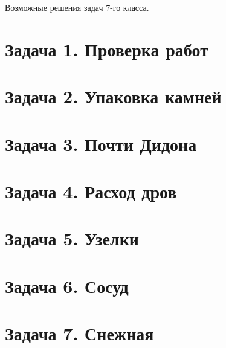 
%


\begin{center}
	\Large{Возможные решения задач 7-го класса.}
\end{center}
\section{Задача 1. Проверка работ}
	
%	
\newpage	
\section{Задача 2. Упаковка камней}
	
%	
\newpage
\section{Задача 3. Почти Дидона}
	
%	
\newpage
\section{Задача 4. Расход дров}
	
%	
\newpage
\section{Задача 5. Узелки}
	
%	
\newpage
\section{Задача 6. Сосуд}
	
%	
\newpage
\section{Задача 7. Снежная}
	
%	
\newpage	

